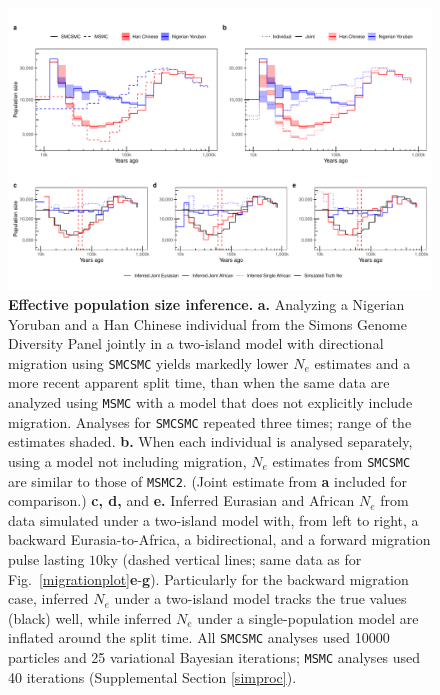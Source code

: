 \begin{figure}
	\centering
	\includegraphics[width=\textwidth]{plot/new_ne_figure.pdf}
	\caption[Effective Population Size Inference]{{\bf Effective population size inference.} {\bf a.} Analyzing a Nigerian Yoruban and a Han Chinese individual from the Simons Genome Diversity Panel jointly in a two-island model with directional migration using {\tt SMCSMC} yields markedly lower $N_e$ estimates and a more recent apparent split time, than when the same data are analyzed using {\tt MSMC} with a model that does not explicitly include migration. Analyses for {\tt SMCSMC} repeated three times; range of the estimates shaded. {\bf b.} When each individual is analysed separately, using a model not including migration, $N_e$ estimates from {\tt SMCSMC} are similar to those of {\tt MSMC2}. (Joint estimate from {\bf a} included for comparison.) {\bf c, d,} and {\bf e.} 
	Inferred Eurasian and African $N_e$ from data simulated under a two-island model with, from left to right, a backward Eurasia-to-Africa, a bidirectional, and a forward  migration pulse lasting $10$ky (dashed vertical lines; same data as for Fig.\ \ref{migrationplot}{\bf e}-{\bf g}).  Particularly for the backward migration case, inferred $N_e$ under a two-island model tracks the true values (black) well, while inferred $N_e$ under a single-population model are inflated around the split time.
 All {\tt SMCSMC} analyses used 10000 particles and 25 variational Bayesian iterations; {\tt MSMC} analyses used 40 iterations (Supplemental Section \ref{simproc}).}

\end{figure}
